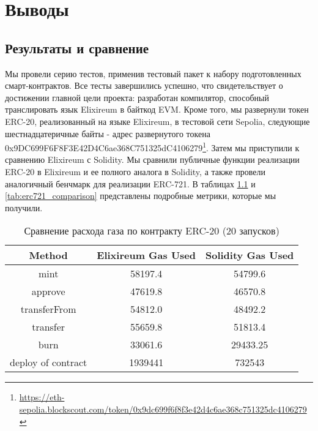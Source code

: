 \chapter{Выводы}
\label{chap:conclusion}

\section{Результаты и сравнение}
\label{sec:results_and_comparison}
Мы провели серию тестов, применив тестовый пакет к набору подготовленных смарт-контрактов. Все тесты завершились успешно, что свидетельствует о достижении главной цели проекта: разработан компилятор, способный транслировать язык Elixireum в байткод EVM. Кроме того, мы развернули токен ERC-20, реализованный на языке Elixireum, в тестовой сети Sepolia, следующие шестнадцатеричные байты - адрес развернутого токена 0x9DC699F6F8F3E42D4C6ae368C751325dC4106279\footnote{\url{https://eth-sepolia.blockscout.com/token/0x9dc699f6f8f3e42d4c6ae368c751325dc4106279}}. Затем мы приступили к сравнению Elixireum с Solidity. Мы сравнили публичные функции реализации ERC-20 в Elixireum и ее полного аналога в Solidity, а также провели аналогичный бенчмарк для реализации ERC-721. В таблицах \ref{tab:erc20_comparison} и \ref{tab:erc721_comparison} представлены подробные метрики, которые мы получили.

\begin{table}[h!]
  \centering
  \renewcommand{\arraystretch}{1.2}
  \begin{tabular}{|c|c|c|}
  \hline
  \textbf{Method} & \textbf{Elixireum Gas Used} & \textbf{Solidity Gas Used} \\ \hline
  mint            & 58197.4              & 54799.6              \\ \hline
  approve         & 47619.8              & 46570.8              \\ \hline
  transferFrom    & 54812.0              & 48492.2              \\ \hline
  transfer        & 55659.8              & 51813.4              \\ \hline
  burn            & 33061.6              & 29433.25             \\ \hline
  deploy of contract       & 1939441              & 732543               \\ \hline
  \end{tabular}
  \caption{Сравнение расхода газа по контракту ERC-20 (20 запусков)}
  \label{tab:erc20_comparison}
  \end{table}
  
